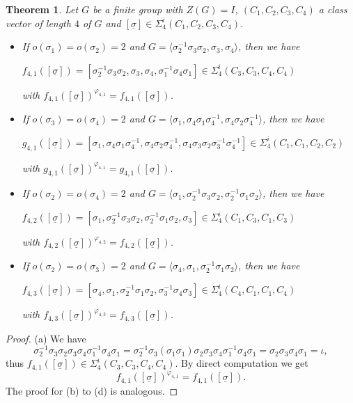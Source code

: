 \documentclass[12pt,a4paper]{article}
\newtheorem{theorem}{Theorem}[section]
\numberwithin{equation}{section}
\numberwithin{table}{section}
\begin{document}
\begin{theorem}
\label{TranslationOfBraidOrbits}
Let $G$ be a finite group with $Z(G)=I$, $(C_1,C_2,C_3,C_4)$ a class vector of length $4$ of $G$
and $[\underline{\sigma}] \in \Sigma^i_4(C_1,C_2,C_3,C_4)$.
\begin{itemize}
\item[(a)]
If $o(\sigma_1) = o(\sigma_2) = 2$ and 
$G=\langle \sigma^{-1}_2 \sigma_3 \sigma_2, \sigma_3, \sigma_4 \rangle$, 
then we have
\par
$f_{4,1}([\underline{\sigma}])=[\sigma^{-1}_2 \sigma_3 \sigma_2, \sigma_3, \sigma_4, \sigma^{-1}_1 \sigma_4 \sigma_1]
\in \Sigma^i_4(C_3,C_3,C_4,C_4)$
\par
with $f_{4,1}([\underline{\sigma}])^{\varphi_{4,1}} = f_{4,1}([\underline{\sigma}])$.
\item[(b)]
If $o(\sigma_3) = o(\sigma_4) = 2$ and 
$G=\langle \sigma_1, \sigma_4 \sigma_1 \sigma^{-1}_4, \sigma_4 \sigma_2 \sigma^{-1}_4 \rangle$, 
then we have
\par
$g_{4,1}([\underline{\sigma}])=[\sigma_1, \sigma_4 \sigma_1 \sigma^{-1}_4, \sigma_4 \sigma_2 \sigma^{-1}_4, 
\sigma_4 \sigma_3 \sigma_2 \sigma^{-1}_3 \sigma^{-1}_4] \in \Sigma^i_4(C_1,C_1,C_2,C_2)$
\par
with $g_{4,1}([\underline{\sigma}])^{\varphi_{4,1}} = g_{4,1}([\underline{\sigma}])$.
\item[(c)]
If $o(\sigma_2) = o(\sigma_4) = 2$ and 
$G=\langle \sigma_1, \sigma^{-1}_2 \sigma_3 \sigma_2, \sigma^{-1}_2 \sigma_1 \sigma_2 \rangle$, 
then we have
\par
$f_{4,2}([\underline{\sigma}])=[\sigma_1, \sigma^{-1}_2 \sigma_3 \sigma_2, \sigma^{-1}_2 \sigma_1 \sigma_2, \sigma_3]
\in \Sigma^i_4(C_1,C_3,C_1,C_3)$
\par
with $f_{4,2}([\underline{\sigma}])^{\varphi_{4,2}} = f_{4,2}([\underline{\sigma}])$.
\item[(d)]
If $o(\sigma_2) = o(\sigma_3) = 2$ and 
$G=\langle  \sigma_4, \sigma_1, \sigma^{-1}_2 \sigma_1 \sigma_2 \rangle$, 
then we have
\par
$f_{4,3}([\underline{\sigma}])=[\sigma_4, \sigma_1, \sigma^{-1}_2 \sigma_1 \sigma_2, \sigma^{-1}_3 \sigma_4 \sigma_3]
\in \Sigma^i_4(C_4,C_1,C_1,C_4)$
\par
with $f_{4,3}([\underline{\sigma}])^{\varphi_{4,3}} = f_{4,3}([\underline{\sigma}])$.
\end{itemize}
\end{theorem}
\begin{proof}
(a) We have
$$\sigma^{-1}_2 \sigma_3 \sigma_2 \sigma_3 \sigma_4 \sigma^{-1}_1 \sigma_4 \sigma_1 =
\sigma^{-1}_2 \sigma_3 (\sigma_1 \sigma_1) \sigma_2 \sigma_3 \sigma_4 \sigma^{-1}_1 \sigma_4 \sigma_1 =
\sigma_2 \sigma_3 \sigma_4 \sigma_1 = \iota,$$
thus $f_{4,1}([\underline{\sigma}]) \in \Sigma^i_4(C_3,C_3,C_4,C_4)$.
By direct computation we get 
$$f_{4,1}([\underline{\sigma}])^{\varphi_{4,1}} = f_{4,1}([\underline{\sigma}]).$$
The proof for (b) to (d) is analogous.
\end{proof}
\end{document}
